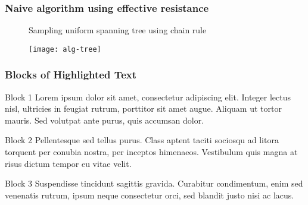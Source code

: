 \documentclass{beamer}
\begin{document}
\begin{frame}
\frametitle{Naive algorithm using effective resistance}


\begin{figure}

\begin{algorithm}[H]
 
 \caption{Sampling uniform spanning tree using chain rule}
\end{algorithm}
 
\end{figure}


\end{frame}

\begin{frame}
\begin{figure}

\centering
 \texttt{[image: alg-tree]}
 
\end{figure}
\end{frame}



\begin{frame}
\frametitle{Blocks of Highlighted Text}
\pause
\begin{block}{Block 1}
Lorem ipsum dolor sit amet, consectetur adipiscing elit. Integer lectus nisl, ultricies in feugiat rutrum, porttitor sit amet augue. Aliquam ut tortor mauris. Sed volutpat ante purus, quis accumsan dolor.
\end{block}
\pause
\begin{block}{Block 2}
Pellentesque sed tellus purus. Class aptent taciti sociosqu ad litora torquent per conubia nostra, per inceptos himenaeos. Vestibulum quis magna at risus dictum tempor eu vitae velit.
\end{block}
\pause
\begin{block}{Block 3}
Suspendisse tincidunt sagittis gravida. Curabitur condimentum, enim sed venenatis rutrum, ipsum neque consectetur orci, sed blandit justo nisi ac lacus.
\end{block}
\end{frame}
\end{document}
